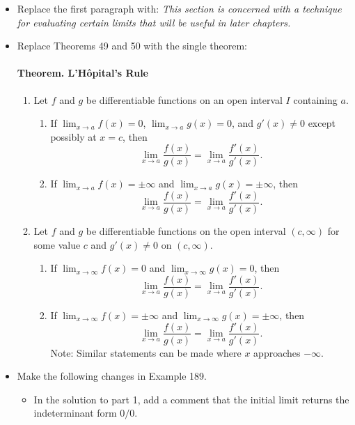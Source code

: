 \documentclass[12pt]{report}
\begin{document}
\begin{itemize}

\item Replace the first paragraph with: {\slshape This section is concerned with a technique for evaluating certain limits that will be useful in later chapters.}

\item Replace Theorems 49 and 50 with the single theorem:

{\slshape\paragraph{Theorem. L'H\^opital's Rule}  
\begin{enumerate}
\item Let $f$ and $g$ be differentiable functions on an open interval $I$ containing $a$.
\begin{enumerate}
\item If $\displaystyle\lim_{x\to a}f(x)=0$, $\displaystyle\lim_{x\to a}g(x)=0$, and $g'(x)\neq 0$ except possibly at $x=c$, then \[\lim_{x\to a}\frac{f(x)}{g(x)}=\lim_{x\to a} \frac{f'(x)}{g'(x)}.\]
\item If  $\displaystyle\lim_{x\to a}f(x)=\pm\infty$ and $\displaystyle\lim_{x\to a}g(x)=\pm\infty$, then \[\lim_{x\to a}\frac{f(x)}{g(x)}=\lim_{x\to a} \frac{f'(x)}{g'(x)}.\]
\end{enumerate}
\item Let $f$ and $g$ be differentiable functions on the open interval $(c,\infty)$ for some value $c$ and $g'(x)\neq0$ on $(c,\infty)$.
\begin{enumerate}
\item If $\displaystyle\lim_{x\to \infty}f(x)=0$ and $\displaystyle\lim_{x\to \infty}g(x)=0$, then \[\lim_{x\to a}\frac{f(x)}{g(x)}=\lim_{x\to a} \frac{f'(x)}{g'(x)}.\]
\item If  $\displaystyle\lim_{x\to \infty}f(x)=\pm\infty$ and $\displaystyle\lim_{x\to \infty}g(x)=\pm\infty$, then \[\lim_{x\to a}\frac{f(x)}{g(x)}=\lim_{x\to a} \frac{f'(x)}{g'(x)}.\] Note:  Similar statements can be made where $x$ approaches $-\infty$.
\end{enumerate}
\end{enumerate}
}
\item Make the following changes in Example 189.
\begin{itemize}
\item In the solution to part 1, add a comment that the initial limit returns the indeterminant form $0/0$.


\end{itemize}
\end{itemize}
\end{document}
